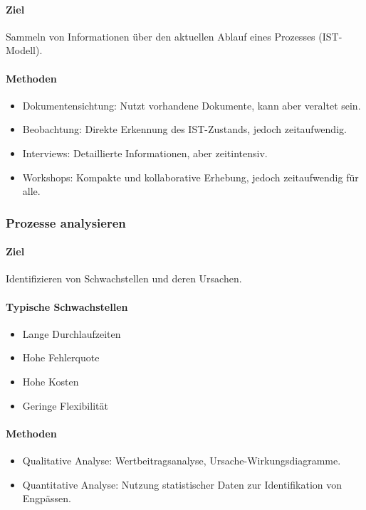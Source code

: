         \paragraph*{Ziel}
            Sammeln von Informationen über den aktuellen Ablauf eines Prozesses (IST-Modell).
        \paragraph*{Methoden}
            \begin{itemize}
                \item Dokumentensichtung: Nutzt vorhandene Dokumente, kann aber veraltet sein.
                \item Beobachtung: Direkte Erkennung des IST-Zustands, jedoch zeitaufwendig.
                \item Interviews: Detaillierte Informationen, aber zeitintensiv.
                \item Workshops: Kompakte und kollaborative Erhebung, jedoch zeitaufwendig für alle.
            \end{itemize}

    \subsubsection{Prozesse analysieren}
        \paragraph*{Ziel}
            Identifizieren von Schwachstellen und deren Ursachen.
        \paragraph*{Typische Schwachstellen}
            \begin{itemize}
                \item Lange Durchlaufzeiten
                \item Hohe Fehlerquote
                \item Hohe Kosten
                \item Geringe Flexibilität
            \end{itemize}
        \paragraph*{Methoden}
            \begin{itemize}
                \item Qualitative Analyse: Wertbeitragsanalyse, Ursache-Wirkungsdiagramme.
                \item Quantitative Analyse: Nutzung statistischer Daten zur Identifikation von Engpässen.
            \end{itemize}

